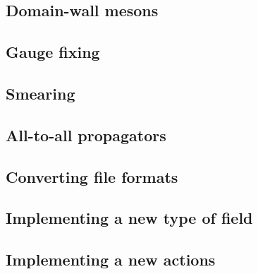 \subsection{Domain-wall mesons}

\subsection{Gauge fixing}

\subsection{Smearing}

\subsection{All-to-all propagators}

\subsection{Converting file formats}

\subsection{Implementing a new type of field}

\subsection{Implementing a new actions}


